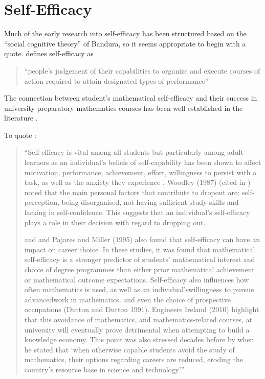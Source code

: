 \documentclass[twoside,12pt,a4paper]{report}
\begin{document}
\section{Self-Efficacy}

Much of the early research into self-efficacy has been structured based on the ``social cognitive theory'' of Bandura, so it seems appropriate to begin with a quote.  defines self-efficacy as 
\begin{quote}
``people’s judgement of their capabilities to organize and execute
courses of action required to attain designated types of performance''
\end{quote}


The connection between student's mathematical self-efficacy and their success in university preparatory mathematics courses has been well established in the literature \cite{Burton1987, Klinger2006, Klinger2011}. 

To quote :
\begin{quote}
``Self-efficacy
is vital among all students but particularly among adult learners as an individual’s
beliefs of self-capability has been shown to affect motivation, performance, achievement, effort, willingness to persist with a task, as well as the anxiety they experience
\cite{Bandura1997, Pajares1994, Pajares1996, Pajares1997, Pajares1999}. Woodley (1987) (cited in \cite{McGivney1996}) noted that the main personal
factors that contribute to dropout are: self-perception, being disorganised, not
having sufficient study skills and lacking in self-confidence. This suggests that an individual’s self-efficacy plays a role in their decision with regard to dropping out.

\cite{Hackett1989} and \cite{Pajares1994} and Pajares and Miller (1995) also found that self-efficacy can have an impact on career choice. In these studies, it was found that mathematical self-efficacy is a stronger predictor of students’ mathematical interest and
choice of degree programmes than either prior mathematical achievement or mathematical outcome expectations. Self-efficacy also influences how often mathematics
is used, as well as an individual’swillingness to pursue advancedwork in mathematics,
and even the choice of prospective occupations (Dutton and Dutton 1991). Engineers
Ireland (2010) highlight that this avoidance of mathematics, and mathematics-related
courses, at university will eventually prove detrimental when attempting to build a
knowledge economy. This point was also stressed decades before by \cite[pg34]{Hembree1990}
when he stated that ‘when otherwise capable students avoid the study of
mathematics, their options regarding careers are reduced, eroding the country’s
resource base in science and technology’.''
\end{quote}
\end{document}
